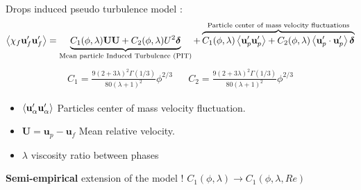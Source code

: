 \documentclass{sintefbeamer}
\begin{document}
\begin{frame}
  {
  Drops induced pseudo turbulence model : 
  }
  \small
  \begin{equation*}
    \left<\chi_f  \textbf{u}_f' \textbf{u}_f'\right>
    =
    \underbrace{
      C_1(\phi,\lambda)\textbf{UU}
    + C_2(\phi,\lambda)U^2 \bm\delta}_\text{Mean particle Induced Turbulence (PIT)}
    + \overbrace{C_1(\phi,\lambda)\left<\textbf{u}_p'\textbf{u}_p'\right>
    + C_2(\phi,\lambda)\left<\textbf{u}_{p}'\cdot \textbf{u}_{p}'\right>\bm\delta
    }^{\text{Particle center of mass velocity fluctuations}}
  \end{equation*}
  \begin{align*}
    C_{1} = \frac{9(2+3\lambda)^2 \Gamma(1/3)}{80 (\lambda +1)^2}\phi^{2/3} 
    &&
    C_2 = \frac{9(2+3\lambda)^2 \Gamma(1/3)}{80 (\lambda +1)^2}\phi^{2/3} 
  \end{align*}
  \begin{itemize}
    \item $\left<\textbf{u}_\alpha'\textbf{u}_\alpha'\right>$ Particles center of mass velocity fluctuation.  
    \item $\textbf{U} = \textbf{u}_p - \textbf{u}_f$ Mean relative velocity. 
    \item $\lambda$ viscosity ratio between phases
  \end{itemize}
\vfill
\textbf{Semi-empirical} extension of the model !
$C_1(\phi, \lambda ) \to C_1(\phi, \lambda ,Re) $ 

\end{frame}
\end{document}
